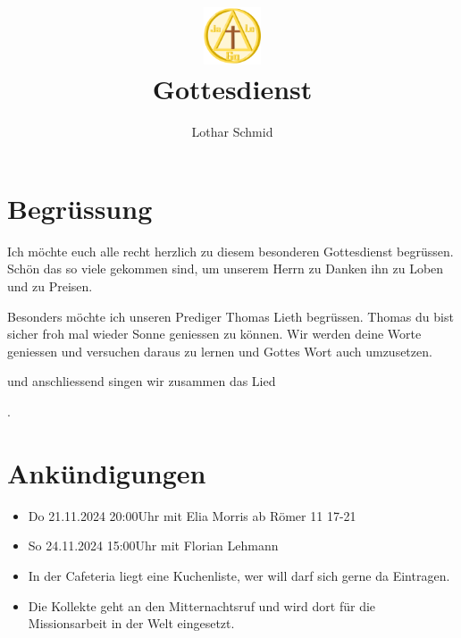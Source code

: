 \documentclass{../inc/mybib}
\title{\includegraphics[height=48pt]{assets/images/logo.png}\\Gottesdienst}
\author{Lothar Schmid}
\begin{document}
\maketitle
\section{Begrüssung}

Ich möchte euch alle recht herzlich zu diesem besonderen Gottesdienst begrüssen. Schön das so viele gekommen sind, um unserem Herrn zu Danken ihn zu Loben und zu Preisen.

Besonders möchte ich unseren Prediger Thomas Lieth begrüssen. Thomas du bist sicher froh mal wieder Sonne geniessen zu können. Wir werden deine Worte geniessen und versuchen daraus zu lernen und Gottes Wort auch umzusetzen.

\noindent
\beten{} und anschliessend singen wir zusammen das Lied

\noindent
{}.

\section{Ankündigungen}
\begin{itemize}
    \item {} Do 21.11.2024 20:00Uhr mit Elia Morris ab Römer 11 17-21
    \item {} So 24.11.2024 15:00Uhr mit Florian Lehmann
    \item {} In der Cafeteria liegt eine Kuchenliste, wer will darf sich gerne da Eintragen.
    \item {} Die Kollekte geht an den Mitternachtsruf und wird dort für die Missionsarbeit in der Welt eingesetzt.
\end{itemize}
\end{document}

